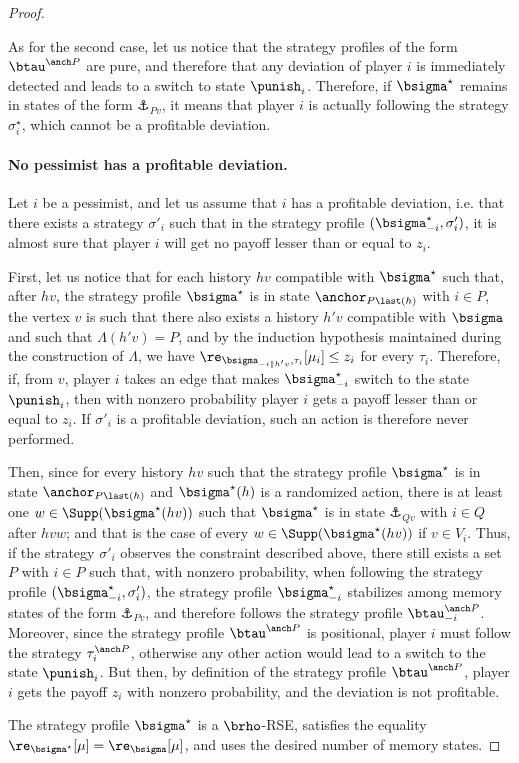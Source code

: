 \begin{proof}
\begin{claimproof}
    As for the second case, let us notice that the strategy profiles of the form $\btau^{\anch P}$ are pure, and therefore that any deviation of player $i$ is immediately detected and leads to a switch to state $\punish_i$.
    Therefore, if $\bsigma^\star$ remains in states of the form $\anchor_{P v}$, it means that player $i$ is actually following the strategy $\sigma^\star_i$, which cannot be a profitable deviation.


    \paragraph*{No pessimist has a profitable deviation.}

    Let $i$ be a pessimist, and let us assume that $i$ has a profitable deviation, i.e. that there exists a strategy $\sigma'_i$ such that in the strategy profile $(\bsigma^\star_{-i}, \sigma'_i)$, it is almost sure that player $i$ will get no payoff lesser than or equal to $z_i$.

    First, let us notice that for each history $hv$ compatible with $\bsigma^\star$ such that, after $hv$, the strategy profile $\bsigma^\star$ is in state $\anchor_{P \last(h)}$ with $i \in P$, the vertex $v$ is such that there also exists a history $h'v$ compatible with $\bsigma$ and such that $\Lambda(h'v) = P$, and by the induction hypothesis maintained during the construction of $\Lambda$, we have $\re_{\bsigma_{-i\|h'v}, \tau_i}[\mu_i] \leq z_i$ for every $\tau_i$.
    Therefore, if, from $v$, player $i$ takes an edge that makes $\bsigma^\star_{-i}$ switch to the state $\punish_i$, then with nonzero probability player $i$ gets a payoff lesser than or equal to $z_i$.
    If $\sigma'_i$ is a profitable deviation, such an action is therefore never performed.

    Then, since for every history $hv$ such that the strategy profile $\bsigma^\star$ is in state $\anchor_{P \last(h)}$ and $\bsigma^\star(h)$ is a randomized action, there is at least one $w \in \Supp(\bsigma^\star(hv))$ such that $\bsigma^\star$ is in state $\anchor_{Q v}$ with $i \in Q$ after $hvw$; and that is the case of every $w \in \Supp(\bsigma^\star(hv))$ if $v \in V_i$.
    Thus, if the strategy $\sigma'_i$ observes the constraint described above, there still exists a set $P$ with $i \in P$ such that, with nonzero probability, when following the strategy profile $(\bsigma^\star_{-i}, \sigma'_i)$, the strategy profile $\bsigma^\star_{-i}$ stabilizes among memory states of the form $\anchor_{P v}$, and therefore follows the strategy profile $\btau^{\anch P}_{-i}$.
    Moreover, since the strategy profile $\btau^{\anch P}$ is positional, player $i$ must follow the strategy $\tau^{\anch P}_i$, otherwise any other action would lead to a switch to the state $\punish_i$.
    But then, by definition of the strategy profile $\btau^{\anch P}$, player $i$ gets the payoff $z_i$ with nonzero probability, and the deviation is not profitable.
    \end{claimproof}
    The strategy profile $\bsigma^\star$ is a $\brho$-RSE, satisfies the equality $\re_{\bsigma^\star}[\mu] = \re_{\bsigma}[\mu]$, and uses the desired number of memory states.
\end{proof}

